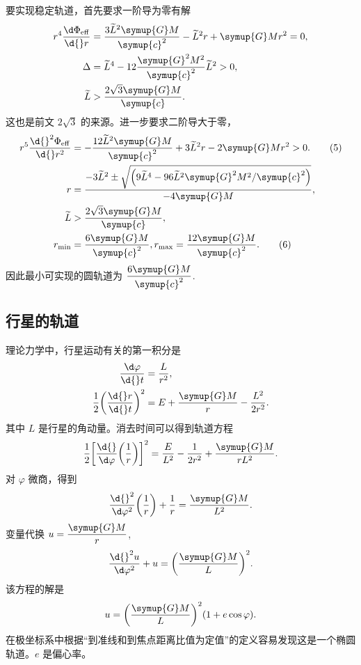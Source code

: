 \documentclass[UTF8, 12pt, a4paper, oneside, onecolumn, fontset=none]{ctexart}
\begin{document}
要实现稳定轨道，首先要求一阶导为零有解
\begin{align}
r^{4}\frac{\d\Phi_{\mathrm{eff}}}{\d{}r}&=\frac{3\widetilde{L}^{2}\symup{G}M}{\symup{c}^{2}}-\widetilde{L}^{2}r+\symup{G}Mr^{2}=0,\\
\Delta&=\widetilde{L}^{4}-12\frac{\symup{G}^{2}M^{2}}{\symup{c}^{2}}\widetilde{L}^{2}>0,\\
\widetilde{L}&>\frac{2\sqrt{3}\symup{G}M}{\symup{c}}.
\end{align}
这也是前文 $2\sqrt{3}$ 的来源。进一步要求二阶导大于零，
\begin{align}
r^{5}\frac{\d{}^{2}\Phi_{\mathrm{eff}}}{\d{}r^{2}}&=-\frac{12\widetilde{L}^{2}\symup{G}M}{\symup{c}^{2}}+3\widetilde{L}^{2}r-2\symup{G}Mr^{2}>0.\tag{5}\\
r&=\frac{-3\widetilde{L}^{2}\pm\sqrt{\mleft(9\widetilde{L}^{4}-96\widetilde{L}^{2}\symup{G}^{2}M^{2}/\symup{c}^{2}\mright)}}{-4\symup{G}M},\notag\\
\widetilde{L}&>\frac{2\sqrt3\symup{G}M}{\symup{c}},\notag\\
r_{\min}&=\frac{6\symup{G}M}{\symup{c}^{2}}, r_{\max}=\frac{12\symup{G}M}{\symup{c}^{2}}.\tag{6}
\end{align}
因此最小可实现的圆轨道为 $\dfrac{6\symup{G}M}{\symup{c}^{2}}$.

\subsection{行星的轨道}
理论力学中，行星运动有关的第一积分是
\begin{align}
\frac{\d\varphi}{\d{}t}&=\frac{L}{r^{2}},\\
\frac{1}{2}\mleft(\frac{\d{}r}{\d{}t}\mright)^{2}&=E+\frac{\symup{G}M}{r}-\frac{L^{2}}{2r^{2}}.
\end{align}
其中 $L$ 是行星的角动量。消去时间可以得到轨道方程
\begin{equation}
\frac{1}{2}\mleft[\frac{\d{}}{\d\varphi}\mleft(\frac{1}{r}\mright)\mright]^{2}=\frac{E}{L^{2}}-\frac{1}{2r^{2}}+\frac{\symup{G}M}{rL^{2}}.
\end{equation}
对 $\varphi$ 微商，得到
\begin{equation}
\frac{\d{}^{2}}{\d\varphi^{2}}\mleft(\frac{1}{r}\mright)+\frac{1}{r}=\frac{\symup{G}M}{L^{2}}.
\end{equation}
变量代换 $u=\dfrac{\symup{G}M}{r}$,
\begin{equation}
\frac{\d{}^{2}u}{\d\varphi^{2}}+u=\mleft(\frac{\symup{G}M}{L}\mright)^{2}.
\end{equation}
该方程的解是
\begin{equation}
u=\mleft(\frac{\symup{G}M}{L}\mright)^{2}\mleft(1+e\cos{\varphi}\mright).
\end{equation}
在极坐标系中根据“到准线和到焦点距离比值为定值”的定义容易发现这是一个椭圆轨道。$e$ 是偏心率。
\end{document}
